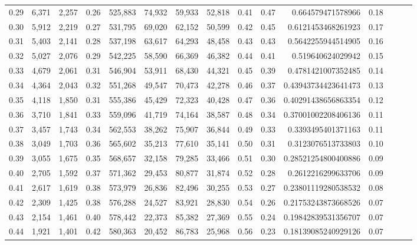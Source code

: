 \begin{tabular}{rrrrrrrrrrrrrrr}
0.29 &   6,371 &  2,257 &  0.26 &  525,883 &   74,932 &   59,933 &   52,818 &  0.41 &  0.47 &       0.664579471578966 &      0.18 \\
0.30 &   5,912 &  2,219 &  0.27 &  531,795 &   69,020 &   62,152 &   50,599 &  0.42 &  0.45 &      0.6121453468261923 &      0.17 \\
0.31 &   5,403 &  2,141 &  0.28 &  537,198 &   63,617 &   64,293 &   48,458 &  0.43 &  0.43 &      0.5642255944514905 &      0.16 \\
0.32 &   5,027 &  2,076 &  0.29 &  542,225 &   58,590 &   66,369 &   46,382 &  0.44 &  0.41 &       0.519640624029942 &      0.15 \\
0.33 &   4,679 &  2,061 &  0.31 &  546,904 &   53,911 &   68,430 &   44,321 &  0.45 &  0.39 &      0.4781421007352485 &      0.14 \\
0.34 &   4,364 &  2,043 &  0.32 &  551,268 &   49,547 &   70,473 &   42,278 &  0.46 &  0.37 &     0.43943734423641473 &      0.13 \\
0.35 &   4,118 &  1,850 &  0.31 &  555,386 &   45,429 &   72,323 &   40,428 &  0.47 &  0.36 &     0.40291438656863354 &      0.12 \\
0.36 &   3,710 &  1,841 &  0.33 &  559,096 &   41,719 &   74,164 &   38,587 &  0.48 &  0.34 &     0.37001002208406136 &      0.11 \\
0.37 &   3,457 &  1,743 &  0.34 &  562,553 &   38,262 &   75,907 &   36,844 &  0.49 &  0.33 &      0.3393495401371163 &      0.11 \\
0.38 &   3,049 &  1,703 &  0.36 &  565,602 &   35,213 &   77,610 &   35,141 &  0.50 &  0.31 &      0.3123076513733803 &      0.10 \\
0.39 &   3,055 &  1,675 &  0.35 &  568,657 &   32,158 &   79,285 &   33,466 &  0.51 &  0.30 &     0.28521254800400886 &      0.09 \\
0.40 &   2,705 &  1,592 &  0.37 &  571,362 &   29,453 &   80,877 &   31,874 &  0.52 &  0.28 &      0.2612216299633706 &      0.09 \\
0.41 &   2,617 &  1,619 &  0.38 &  573,979 &   26,836 &   82,496 &   30,255 &  0.53 &  0.27 &     0.23801119280538532 &      0.08 \\
0.42 &   2,309 &  1,425 &  0.38 &  576,288 &   24,527 &   83,921 &   28,830 &  0.54 &  0.26 &     0.21753243873668526 &      0.07 \\
0.43 &   2,154 &  1,461 &  0.40 &  578,442 &   22,373 &   85,382 &   27,369 &  0.55 &  0.24 &     0.19842839531356707 &      0.07 \\
0.44 &   1,921 &  1,401 &  0.42 &  580,363 &   20,452 &   86,783 &   25,968 &  0.56 &  0.23 &     0.18139085240929126 &      0.07 \\

\end{tabular}
